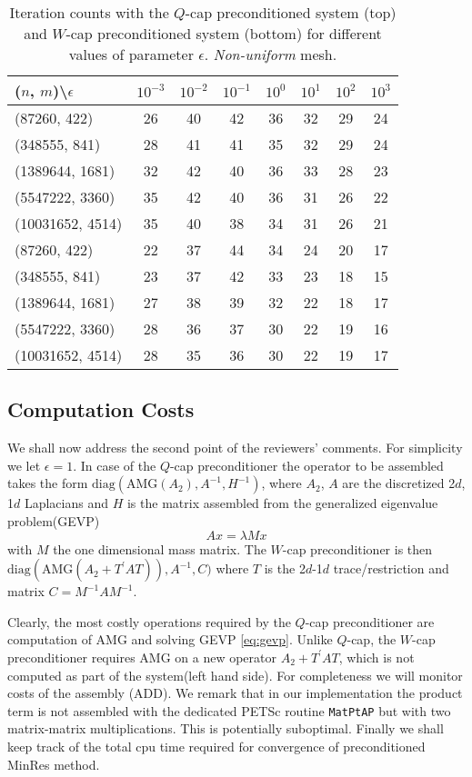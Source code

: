 \documentclass[10pt, a4paper]{article}
\newcommand{\dual}[1]{\ensuremath{{#1}^{\prime}}}
\begin{document}
\begin{table}[ht]
  \caption{Iteration counts with the $Q$-cap preconditioned system (top) and $W$-cap 
  preconditioned system (bottom) for different values of parameter $\epsilon$. 
  \textit{Non-uniform} mesh.
}
\label{tab:iter_unif}
\footnotesize{
\begin{tabular}{l|ccccccc}
\hline
($n$, $m$)\textbackslash $\epsilon$ & $10^{-3}$ & $10^{-2}$ & $10^{-1}$ & $10^{0}$ & $10^{1}$ & $10^{2}$ & $10^{3}$\\
\hline
(87260, 422) & 26 & 40 & 42 & 36 & 32 & 29 & 24\\
(348555, 841) & 28 & 41 & 41 & 35 & 32 & 29 & 24\\
(1389644, 1681) & 32 & 42 & 40 & 36 & 33 & 28 & 23\\
(5547222, 3360) & 35 & 42 & 40 & 36 & 31 & 26 & 22\\
(10031652, 4514) & 35 & 40 & 38 & 34 & 31 & 26 & 21\\
\hline
\hline
(87260, 422) & 22 & 37 & 44 & 34 & 24 & 20 & 17\\
(348555, 841) & 23 & 37 & 42 & 33 & 23 & 18 & 15\\
(1389644, 1681) & 27 & 38 & 39 & 32 & 22 & 18 & 17\\
(5547222, 3360) & 28 & 36 & 37 & 30 & 22 & 19 & 16\\
(10031652, 4514) & 28 & 35 & 36 & 30 & 22 & 19 & 17\\
\hline
\end{tabular}
}
\end{table}

\subsection*{Computation Costs} We shall now address the second point of the 
reviewers' comments. For simplicity we let $\epsilon=1$. In case of the $Q$-cap 
preconditioner the operator to be assembled takes the form
$\text{diag}(\text{AMG}(A_2), A^{-1}, H^{-1})$, 
where $A_2$, $A$ are the discretized 2$d$, 1$d$ Laplacians and $H$ is the matrix 
assembled from the generalized eigenvalue problem(GEVP)
%
\begin{equation}\label{eq:gevp}
  Ax=\lambda M x
\end{equation}
%
with $M$ the one dimensional mass matrix. The $W$-cap preconditioner is then 
$\text{diag}(\text{AMG}(A_2+\dual{T}AT)), A^{-1}, C)$  where $T$ is the 2$d$-1$d$ 
trace/restriction and matrix $C=M^{-1}AM^{-1}$. 

Clearly, the most costly operations required by the $Q$-cap preconditioner are
computation of AMG and solving GEVP \eqref{eq:gevp}. Unlike
$Q$-cap, the $W$-cap preconditioner requires AMG on a new operator
$A_2+\dual{T}AT$, which is not computed as part of the system(left hand side). 
For completeness we will monitor costs of the assembly (ADD). We remark that in our
implementation the product term is not assembled with the dedicated PETSc
routine \texttt{MatPtAP} but with two matrix-matrix multiplications. This is
potentially suboptimal. Finally we shall keep track of the total cpu time
required for convergence of preconditioned MinRes method.
\end{document}
